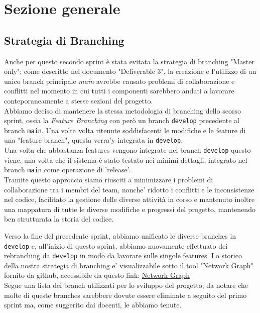 \documentclass{article}
\begin{document}
\clearpage

\section{Sezione generale}

\subsection{Strategia di Branching}
Anche per questo secondo sprint è stata evitata la strategia di branching "Master only": come descritto nel documento "Deliverable 3", la creazione e l'utilizzo di un unico branch principale \textit{main} avrebbe causato problemi di collaborazione e conflitti nel momento in cui tutti i componenti sarebbero andati a lavorare conteporaneamente a stesse sezioni del progetto. \\

\noindent
Abbiamo deciso di mantenere la stessa metodologia di branching dello scorso sprint, ossia la \textit{Feature Branching} con però un branch \texttt{develop} precedente al branch \texttt{main}. Una volta volta ritenute soddisfacenti le modifiche e le feature di una "feature branch", questa verra'y integrata in \texttt{develop}.\\
Una volta che abbastanza features vengono integrate nel branch \texttt{develop} questo viene, una volta che il sistema è stato testato nei minimi dettagli, integrato nel branch \texttt{main} come operazione di 'release'.\\

\noindent
Tramite questo approccio siamo riusciti a minimizzare i problemi di  collaborazione tra i membri del team, nonche' ridotto i conflitti e le inconsistenze nel codice, facilitato la gestione delle diverse attività in corso e mantenuto inoltre una mappatura di tutte le diverse modifiche e progressi del progetto, mantenendo ben strutturata la storia del codice.

\noindent
Verso la fine del precedente sprint, abbiamo unificato le diverse branches in \texttt{develop} e, all'inizio di questo sprint, abbiamo nuovamente effettuato dei rebranching da \texttt{develop} in modo da lavorare sulle singole features.
Lo storico della nostra strategia di branching e' visualizzabile sotto il tool "Network Graph" fornito da github, accessibile da questo link:
\href{https://github.com/ELI20ZIVI/BeeLive/network}{Network Graph}\\

\noindent Segue una lista dei branch utilizzati per lo sviluppo del progetto; da notare che molte di queste branches sarebbere dovute essere eliminate a seguito del primo sprint ma, come suggerito dai docenti, le abbiamo tenute.
\end{document}
